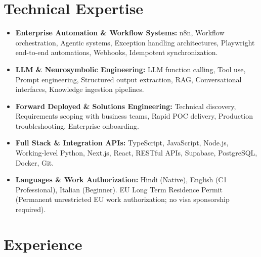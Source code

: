 \documentclass[10pt,a4paper]{article}
\begin{document}
\section{Technical Expertise}
\begin{itemize}
  \item \textbf{Enterprise Automation \& Workflow Systems:} n8n, Workflow orchestration, Agentic systems, Exception handling architectures, Playwright end-to-end automations, Webhooks, Idempotent synchronization.
  \item \textbf{LLM \& Neurosymbolic Engineering:} LLM function calling, Tool use, Prompt engineering, Structured output extraction, RAG, Conversational interfaces, Knowledge ingestion pipelines.
  \item \textbf{Forward Deployed \& Solutions Engineering:} Technical discovery, Requirements scoping with business teams, Rapid POC delivery, Production troubleshooting, Enterprise onboarding.
  \item \textbf{Full Stack \& Integration APIs:} TypeScript, JavaScript, Node.js, Working-level Python, Next.js, React, RESTful APIs, Supabase, PostgreSQL, Docker, Git.
  \item \textbf{Languages \& Work Authorization:} Hindi (Native), English (C1 Professional), Italian (Beginner). EU Long Term Residence Permit (Permanent unrestricted EU work authorization; no visa sponsorship required).
\end{itemize}

\section{Experience}
\end{document}
